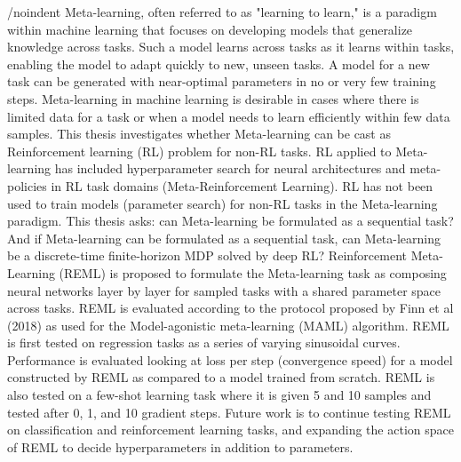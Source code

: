 /noindent Meta-learning, often referred to as "learning to learn," is a paradigm within machine learning 
that focuses on developing models that generalize knowledge across tasks. Such a model learns across 
tasks as it learns within tasks, enabling the model to adapt quickly to new, unseen tasks. A model for 
a new task can be generated with near-optimal parameters in no or very few training steps. Meta-learning 
in machine learning is desirable in cases where there is limited data for a task or when a model needs 
to learn efficiently within few data samples. This thesis investigates whether Meta-learning can be cast 
as Reinforcement learning (RL) problem for non-RL tasks. RL applied to Meta-learning has included 
hyperparameter search for neural architectures and meta-policies in RL task domains (Meta-Reinforcement 
Learning). RL has not been used to train models (parameter search) for non-RL tasks in the Meta-learning 
paradigm. This thesis asks: can Meta-learning be formulated as a sequential task? And if Meta-learning 
can be formulated as a sequential task, can Meta-learning be a discrete-time finite-horizon MDP solved 
by deep RL? Reinforcement Meta-Learning (REML) is proposed to formulate the Meta-learning task as 
composing neural networks layer by layer for sampled tasks with a shared parameter space across tasks. 
REML is evaluated according to the protocol proposed by Finn et al (2018) as used for the Model-agonistic 
meta-learning (MAML) algorithm. REML is first tested on regression tasks as a series of varying sinusoidal 
curves. Performance is evaluated looking at loss per step (convergence speed) for a model constructed by 
REML as compared to a model trained from scratch. REML is also tested on a few-shot learning task where 
it is given 5 and 10 samples and tested after 0, 1, and 10 gradient steps. Future work is to continue 
testing REML on classification and reinforcement learning tasks, and expanding  the action space of REML 
to decide hyperparameters in addition to parameters.
\clearpage